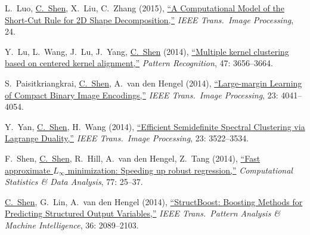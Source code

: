 \documentclass[9pt, a4paper]{article}
\newcommand{\years}[1]{\marginnote{\scriptsize #1}}
\def\highlight{\uline}
\begin{document}
\medskip

\years{2015} L.~Luo, \highlight{C.~Shen}, X.~Liu, C.~Zhang (2015),
\href{http://www.google.com/search?lr=&ie=UTF-8&oe=UTF-8&q=A+Computational+Model+of+the+Short-Cut+Rule+for+2D+Shape+Decomposition+Lei+Luo%2C+Chunhua+Shen%2C+Xinwang+Liu%2C+Chunyuan+Zhang}{``A Computational Model of the Short-Cut Rule for {2D} Shape Decomposition,{}''}
\emph{IEEE Trans.\  Image Processing}, 24.

\medskip

\years{2014} Y.~Lu, L.~Wang, J.~Lu, J.~Yang, \highlight{C.~Shen} (2014),
\href{http://www.google.com/search?lr=&ie=UTF-8&oe=UTF-8&q=Multiple+kernel+clustering+based+on+centered+kernel+alignment+Yanting+Lu%2C+Liantao+Wang%2C+Jianfeng+Lu%2C+Jingyu+Yang%2C+Chunhua+Shen}{``Multiple kernel clustering based on centered kernel alignment,{}''}
\emph{Pattern Recognition}, 47: 3656--3664.

\medskip

\years{2014} S.~Paisitkriangkrai, \highlight{C.~Shen}, A.~van den Hengel (2014),
\href{http://www.google.com/search?lr=&ie=UTF-8&oe=UTF-8&q=Large-margin+Learning+of+Compact+Binary+Image+Encodings+Sakrapee+Paisitkriangkrai%2C+Chunhua+Shen%2C+Anton+van+den+Hengel}{``Large-margin Learning of Compact Binary Image Encodings,{}''}
\emph{IEEE Trans.\  Image Processing}, 23: 4041--4054.

\medskip

\years{2014} Y.~Yan, \highlight{C.~Shen}, H.~Wang (2014),
\href{http://www.google.com/search?lr=&ie=UTF-8&oe=UTF-8&q=Efficient+Semidefinite+Spectral+Clustering+via+Lagrange+Duality+Yan+Yan%2C+Chunhua+Shen%2C+Hanzi+Wang}{``Efficient Semidefinite Spectral Clustering via {L}agrange Duality,{}''}
\emph{IEEE Trans.\  Image Processing}, 23: 3522--3534.

\medskip

\years{2014} F.~Shen, \highlight{C.~Shen}, R.~Hill, A.~van den Hengel, Z.~Tang (2014),
\href{http://www.google.com/search?lr=&ie=UTF-8&oe=UTF-8&q=Fast+approximate+minimization%3A+Speeding+up+robust+regression+Fumin+Shen%2C+Chunhua+Shen%2C+Rhys+Hill%2C+Anton+van+den+Hengel%2C+Zhenmin+Tang}{``Fast approximate $L_\infty$ minimization: {S}peeding up robust regression,{}''}
\emph{Computational Statistics \& Data Analysis}, 77: 25--37.

\medskip

\years{2014} \highlight{C.~Shen}, G.~Lin, A.~van den Hengel (2014),
\href{http://www.google.com/search?lr=&ie=UTF-8&oe=UTF-8&q=StructBoost%3A+Boosting+Methods+for+Predicting+Structured+Output+Variables+Chunhua+Shen%2C+Guosheng+Lin%2C+Anton+van+den+Hengel}{``{StructBoost}: {B}oosting Methods for Predicting Structured Output Variables,{}''}
\emph{IEEE Trans.\  Pattern Analysis \& Machine Intelligence}, 36: 2089--2103.
\end{document}
